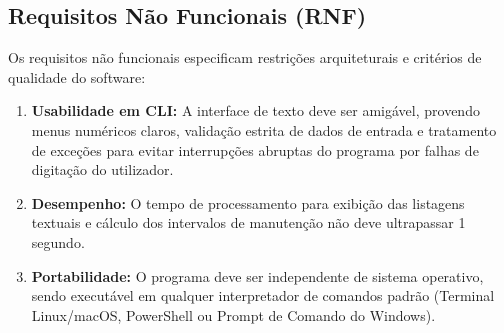 \documentclass[a4paper,12pt]{article}
\begin{document}
\subsection{Requisitos Não Funcionais (RNF)}
Os requisitos não funcionais especificam restrições arquiteturais e critérios de qualidade do software:
\begin{enumerate}[label=\textbf{RNF\arabic*}]
    \item \textbf{Usabilidade em CLI:} A interface de texto deve ser amigável, provendo menus numéricos claros, validação estrita de dados de entrada e tratamento de exceções para evitar interrupções abruptas do programa por falhas de digitação do utilizador.
    \item \textbf{Desempenho:} O tempo de processamento para exibição das listagens textuais e cálculo dos intervalos de manutenção não deve ultrapassar 1 segundo.
    \item \textbf{Portabilidade:} O programa deve ser independente de sistema operativo, sendo executável em qualquer interpretador de comandos padrão (Terminal Linux/macOS, PowerShell ou Prompt de Comando do Windows).
\end{enumerate}
\end{document}
